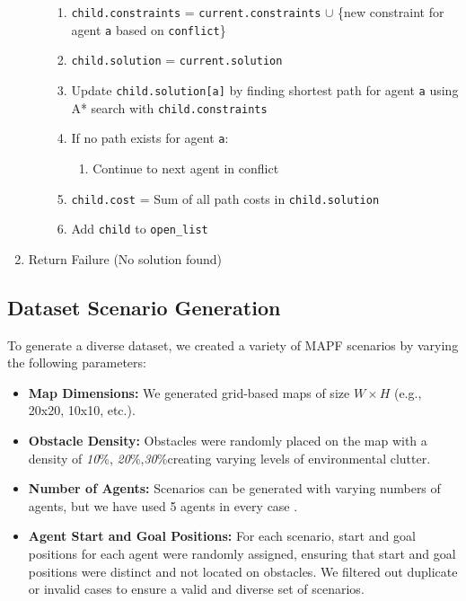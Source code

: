\begin{algorithm}
\begin{enumerate}
\begin{enumerate}
\begin{enumerate}
                    \item \texttt{child.constraints} = \texttt{current.constraints} $\cup$ \{new constraint for agent \texttt{a} based on \texttt{conflict}\}
                    \item \texttt{child.solution} = \texttt{current.solution}
                    \item Update \texttt{child.solution[a]} by finding shortest path for agent \texttt{a} using A* search with \texttt{child.constraints}
                    \item If no path exists for agent \texttt{a}:
                        \begin{enumerate}
                            \item Continue to next agent in conflict
                        \end{enumerate}
                    \item \texttt{child.cost} = Sum of all path costs in \texttt{child.solution}
                    \item Add \texttt{child} to \texttt{open\_list}
                \end{enumerate}
        \end{enumerate}
    \item Return Failure (No solution found)
\end{enumerate}
\end{algorithm}
\subsection{Dataset Scenario Generation}

To generate a diverse dataset, we created a variety of MAPF scenarios by varying the following parameters:

\begin{itemize}
    \item \textbf{Map Dimensions:} We generated grid-based maps of size $W \times H$ (e.g., 20x20, 10x10, etc.).
    \item \textbf{Obstacle Density:} Obstacles were randomly placed on the map with a density of \textit{10}\%, \textit{20}\%,\textit{30}\%creating varying levels of environmental clutter.
    \item \textbf{Number of Agents:} Scenarios can be generated with varying numbers of agents, but we have used 5 agents in every case .
    \item \textbf{Agent Start and Goal Positions:} For each scenario, start and goal positions for each agent were randomly assigned, ensuring that start and goal positions were distinct and not located on obstacles. We filtered out duplicate or invalid cases to ensure a valid and diverse set of scenarios.
\end{itemize}

